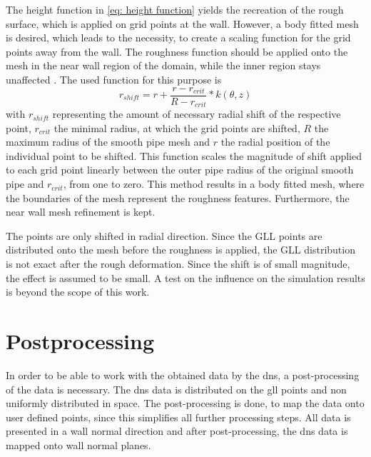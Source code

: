 The height function in \autoref{eq: height function} yields the recreation of the rough surface, which is applied on grid points at the wall.
However, a body fitted mesh is desired, which leads to the necessity, to create a scaling function for the grid points away from the wall.
The roughness function should be applied onto the mesh in the near wall region of the domain, while the inner region stays unaffected \citep{chanSystematicInvestigationRoughness2015}.
The used function for this purpose is
\begin{equation}\label{eq: roughness scaling function}
    r_{shift} = r + \frac{r - r_{crit}}{R - r_{crit}} * k(\theta,z) 
\end{equation}
with $r_{shift}$ representing the amount of necessary radial shift of the respective point, $r_{crit}$ the minimal radius, at which the grid points are shifted, $R$ the maximum radius of the smooth pipe mesh and $r$ the radial position of the individual point to be shifted.
This function scales the magnitude of shift applied to each grid point linearly between the outer pipe radius of the original smooth pipe and $r_{crit}$, from one to zero.
This method results in a body fitted mesh, where the boundaries of the mesh represent the roughness features.
Furthermore, the near wall mesh refinement is kept.

The points are only shifted in radial direction.
Since the GLL points are distributed onto the mesh before the roughness is applied, the GLL distribution is not exact after the rough deformation.
Since the shift is of small magnitude, the effect is assumed to be small.
A test on the influence on the simulation results is beyond the scope of this work. 

\section{Postprocessing}\label{sec: post-processing}
In order to be able to work with the obtained data by the \acrshort{dns}, a post-processing of the data is necessary.
The \acrshort{dns} data is distributed on the \acrshort{gll} points and non uniformly distributed in space.
The post-processing is done, to map the data onto user defined points, since this simplifies all further processing steps.
All data is presented in a wall normal direction and after post-processing, the \acrshort{dns} data is mapped onto wall normal planes.

